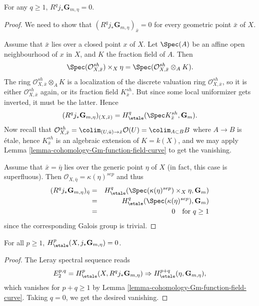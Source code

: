 \begin{lemma}
\label{lemma-higher-direct-jstar-Gm}
For any $q \geq 1$, $R^q j_*\mathbf{G}_{m, \eta} = 0$.
\end{lemma}

\begin{proof}
We need to show that $(R^q j_*\mathbf{G}_{m, \eta})_{\bar x} = 0$ for every
geometric point $\bar x$ of $X$.

\medskip\noindent
Assume that $\bar x$ lies over a closed point $x$ of $X$. Let $\Spec(A)$
be an affine open neighbourhood of $x$ in $X$, and $K$ the fraction field
of $A$. Then
$$
\Spec(\mathcal{O}^{sh}_{X, \bar x}) \times_X \eta =
\Spec(\mathcal{O}^{sh}_{X, \bar x} \otimes_A K).
$$
The ring $\mathcal{O}^{sh}_{X, \bar x} \otimes_A K$ is a localization of
the discrete valuation ring $\mathcal{O}^{sh}_{X, \bar x}$, so it is either
$\mathcal{O}^{sh}_{X, \bar x}$ again, or its fraction field
$K^{sh}_{\bar x}$. But since some local uniformizer gets inverted, it must
be the latter. Hence
$$
(R^q j_*\mathbf{G}_{m, \eta})_{(X, \bar x)} = H_\etale^q(\Spec
K^{sh}_{\bar x}, \mathbf{G}_m).
$$
Now recall that $\mathcal{O}^{sh}_{X, \bar x} =
\colim_{(U, \bar u) \to \bar x} \mathcal{O}(U) = \colim_{A \subset B} B$
where $A \to B$ is \'etale, hence $K^{sh}_{\bar x}$ is an algebraic
extension of $K = k(X)$, and we may apply
Lemma \ref{lemma-cohomology-Gm-function-field-curve}
to get the vanishing.

\medskip\noindent
Assume that $\bar x = \bar \eta$ lies over the generic point $\eta$ of $X$ (in
fact, this case is superfluous). Then $\mathcal{O}_{X, \bar \eta} =
\kappa(\eta)^{sep}$ and thus
\begin{eqnarray*}
(R^q j_*\mathbf{G}_{m, \eta})_{\bar \eta}
& = &
H_\etale^q(\Spec(\kappa(\eta)^{sep}) \times_X \eta, \mathbf{G}_m) \\
& = & H_\etale^q (\Spec(\kappa(\eta)^{sep}), \mathbf{G}_m) \\
& = & 0 \ \ \text{ for } q \geq 1
\end{eqnarray*}
since the corresponding Galois group is trivial.
\end{proof}

\begin{lemma}
\label{lemma-cohomology-jstar-Gm}
For all $p \geq 1$, $H_\etale^p(X, j_*\mathbf{G}_{m, \eta}) = 0$.
\end{lemma}

\begin{proof}
The Leray spectral sequence reads
$$
E_2^{p, q} = H_\etale^p(X, R^qj_*\mathbf{G}_{m, \eta}) \Rightarrow
H_\etale^{p+q}(\eta, \mathbf{G}_{m, \eta}),
$$
which vanishes for $p+q \geq 1$ by
Lemma \ref{lemma-cohomology-Gm-function-field-curve}. Taking
$q = 0$, we get the desired vanishing.
\end{proof}

